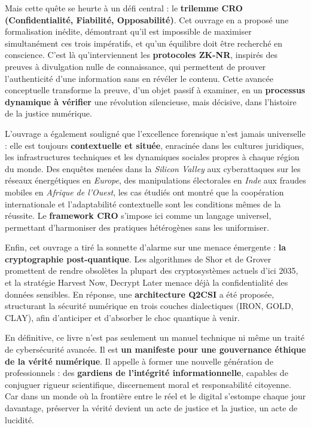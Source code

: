 \documentclass[11pt]{article}
\begin{document}
Mais cette quête se heurte à un défi central : le \textbf{trilemme CRO (Confidentialité, Fiabilité, Opposabilité)}. Cet ouvrage en a proposé une formalisation inédite, démontrant qu’il est impossible de maximiser simultanément ces trois impératifs, et qu’un équilibre doit être recherché en conscience. C’est là qu’interviennent les \textbf{protocoles ZK-NR}, inspirés des preuves à divulgation nulle de connaissance, qui permettent de prouver l’authenticité d’une information sans en révéler le contenu. 
Cette avancée conceptuelle transforme la preuve, d’un objet passif à examiner, en un \textbf{processus dynamique à vérifier} une révolution silencieuse, mais décisive, dans l’histoire de la justice numérique.

L’ouvrage a également souligné que l’excellence forensique n’est jamais universelle : elle est toujours \textbf{contextuelle et située}, enracinée dans les cultures juridiques, les infrastructures techniques et les dynamiques sociales propres à chaque région du monde. Des enquêtes menées dans la \emph{Silicon Valley} aux cyberattaques sur les réseaux énergétiques en \emph{Europe}, des manipulations électorales en \emph{Inde} aux fraudes mobiles en \emph{Afrique de l’Ouest}, les cas étudiés ont montré que la coopération internationale et l’adaptabilité contextuelle sont les conditions mêmes de la réussite. Le \textbf{framework CRO} s’impose ici comme un langage universel, permettant d’harmoniser des pratiques hétérogènes sans les uniformiser.

Enfin, cet ouvrage a tiré la sonnette d’alarme sur une menace émergente : \textbf{la cryptographie post-quantique}. Les algorithmes de Shor et de Grover promettent de rendre obsolètes la plupart des cryptosystèmes actuels d’ici 2035, et la stratégie \og Harvest Now, Decrypt Later\fg{} menace déjà la confidentialité des données sensibles. En réponse, une \textbf{architecture Q2CSI} a été proposée, structurant la sécurité numérique en trois couches dialectiques (IRON, GOLD, CLAY), afin d’anticiper et d’absorber le choc quantique à venir.

En définitive, ce livre n’est pas seulement un manuel technique ni même un traité de cybersécurité avancée. Il est \textbf{un manifeste pour une gouvernance éthique de la vérité numérique}. Il appelle à former une nouvelle génération de professionnels : des \textbf{gardiens de l’intégrité informationnelle}, capables de conjuguer rigueur scientifique, discernement moral et responsabilité citoyenne. 
Car dans un monde où la frontière entre le réel et le digital s’estompe chaque jour davantage, préserver la vérité devient un acte de justice et la justice, un acte de lucidité.
\end{document}
